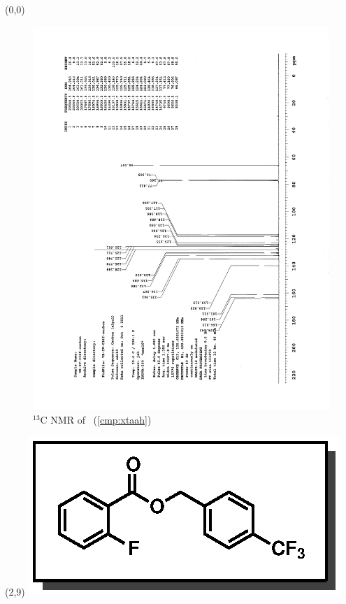 \clearpage
\begin{textblock}{20}(0,0)
\begin{figure}[htb]
\caption{$^{13}$C NMR of  \CMPxtaah\ (\ref{cmp:xtaah})}
\includegraphics[scale=0.75, trim = 0mm 0mm 0mm 5mm,
clip]{chp_asymmetric/images/nmr/xtaahC}
\vspace{-100pt}
\end{figure}
\end{textblock}
\begin{textblock}{1}(2,9)
\includegraphics[scale=0.8, angle=90]{chp_asymmetric/images/xtaah}
\end{textblock}
